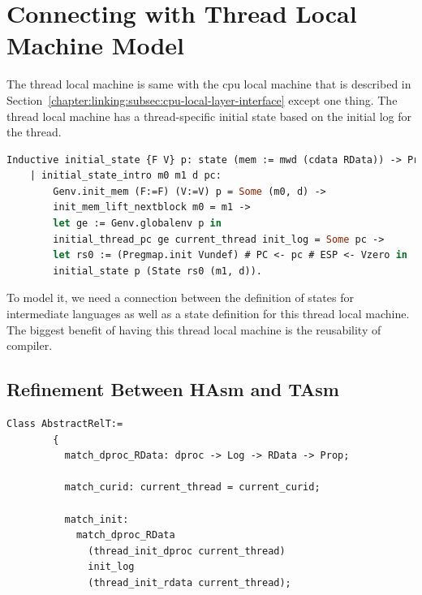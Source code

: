 %
%
%

\section{Connecting with Thread Local Machine Model}
\label{chapter:linking:subsec:connecting-with-thread-local-machine-model}

The thread local machine is same with 
the cpu local machine that is described in Section~\ref{chapter:linking:subsec:cpu-local-layer-interface}
except one thing. 
The thread local machine has a thread-specific initial state 
based on the initial log for the thread. 
\begin{lstlisting}[language=Caml]
  Inductive initial_state {F V} p: state (mem := mwd (cdata RData)) -> Prop :=
    | initial_state_intro m0 m1 d pc:
        Genv.init_mem (F:=F) (V:=V) p = Some (m0, d) ->
        init_mem_lift_nextblock m0 = m1 ->
        let ge := Genv.globalenv p in
        initial_thread_pc ge current_thread init_log = Some pc ->
        let rs0 := (Pregmap.init Vundef) # PC <- pc # ESP <- Vzero in
        initial_state p (State rs0 (m1, d)).
\end{lstlisting}
To model it, 
we need a connection between the definition of states for intermediate languages 
as well as a state definition for this thread local machine. 
The biggest benefit of having this thread local machine is 
the reusability of compiler. 


\subsection{Refinement Between HAsm and TAsm}

\begin{lstlisting}[language=Caml]
      Class AbstractRelT:=
        {
          match_dproc_RData: dproc -> Log -> RData -> Prop;

          match_curid: current_thread = current_curid;

          match_init:
            match_dproc_RData
              (thread_init_dproc current_thread)
              init_log
              (thread_init_rdata current_thread);
\end{lstlisting}

